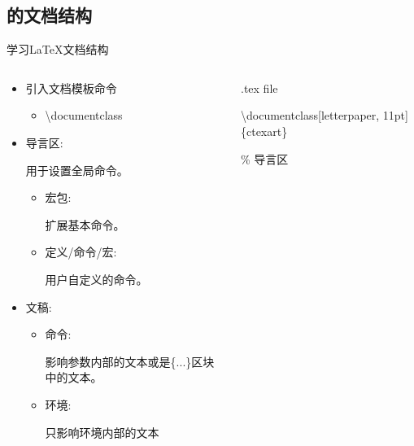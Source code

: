 \documentclass[xcolor=svgnames, t, aspectratio=169]{ctexbeamer}
\begin{document}
\subsection[文档结构]{\latex 的文档结构}\label{sec02-02}
\begin{frame}[t, fragile]{学习\LaTeX}{文档结构}
  \begin{columns}
    \begin{column}{0.5\textwidth}      
      \begin{itemize}
      \item {引入文档模板命令}\\
        \begin{itemize}
        \item {\textbackslash documentclass}
        \end{itemize}
      \item {导言区:} \par
        用于设置全局命令。
        \begin{itemize}
        \item {宏包:} \par
          扩展基本\latex 命令。
        \item { 定义/命令/宏:}\par
          用户自定义的命令。
        \end{itemize}
      \item {文稿:}
        \begin{itemize}
        \item {命令:} \par
          影响参数内部的文本或是\{...\}区块中的文本。  
        \item {环境:} \par
          只影响环境内部的文本
        \end{itemize}
      \end{itemize}
    \end{column}

    \begin{column}{0.45\textwidth}
      \begin{block}{.tex file}
        {
          \tiny \ttfamily
         { \textbackslash documentclass[letterpaper, 11pt]\{ctexart\}} \par
         {\% 导言区 \par          
           \par
       }\par
         
}
\end{block}
\end{column}
\end{columns}
\end{frame}
\end{document}
